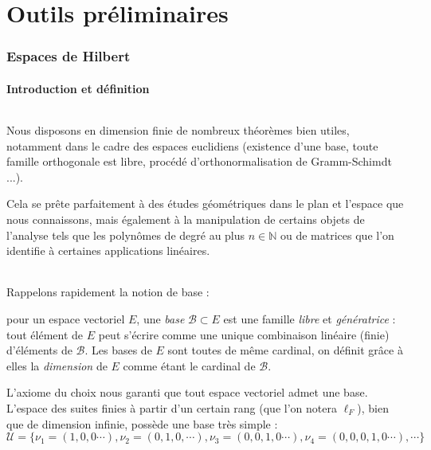 	\newpage
	\part{Outils préliminaires}
	\section{Espaces de Hilbert}
	\subsection{Introduction et définition}

	\paragraph*{}
	
	Nous disposons en dimension finie de nombreux théorèmes bien utiles, notamment dans le cadre des espaces euclidiens (existence d'une base, toute famille orthogonale est libre, procédé d'orthonormalisation de Gramm-Schimdt ...).
	
	Cela se prête parfaitement à des études géométriques dans le plan et l'espace que nous connaissons, mais également à la manipulation de certains objets de l'analyse tels que les polynômes de degré au plus $n \in \mathbb{N}$ ou de matrices que l'on identifie à certaines applications linéaires.
	
	\paragraph*{}
	
	Rappelons rapidement la notion de base :
	
	\begin{mydef}
		pour un espace vectoriel $E$, une \textit{base} $\mathcal{B} \subset E$ est une famille \textit{libre} et \textit{génératrice} : tout élément de $E$ peut s'écrire comme une unique combinaison linéaire (finie) d'éléments de $\mathcal{B}$. Les bases de $E$ sont toutes de même cardinal, on définit grâce à elles la \textit{dimension} de $E$ comme étant le cardinal de $\mathcal{B}$.
	\end{mydef}
	
	L'axiome du choix nous garanti que tout espace vectoriel admet une base. L'espace des suites finies à partir d'un certain rang (que l'on notera $\ell_F$), bien que de dimension infinie, possède une base très simple : $$\mathcal{U} = \{\nu_1 = (1, 0, 0 \cdots), \nu_2 = (0, 1, 0, \cdots), \nu_3 = (0, 0, 1, 0 \cdots), \nu_4 = (0, 0, 0, 1, 0 \cdots), \cdots\}$$
	
